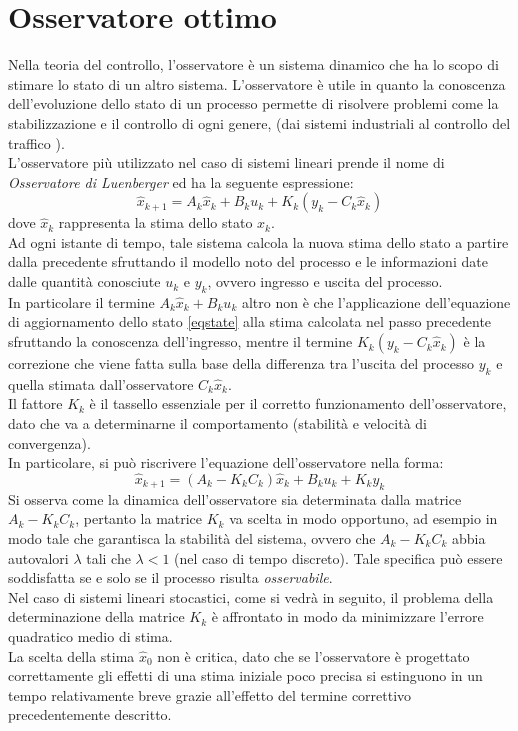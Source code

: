 \section{Osservatore ottimo}
Nella teoria del controllo, l'osservatore è un sistema dinamico che ha lo scopo di stimare lo stato di un altro sistema. L'osservatore è utile in quanto la conoscenza dell'evoluzione dello stato di un processo permette di risolvere problemi come la stabilizzazione e il controllo di ogni genere, (dai sistemi industriali \cite{Industrial} al controllo del traffico \cite{Traffic}).\\

L'osservatore più utilizzato nel caso di sistemi lineari prende il nome di \textit{Osservatore di Luenberger}\cite{bolzern} ed ha la seguente espressione:
\begin{equation}
\label{obsv}
\hat{x}_{k+1}=A_k\hat{x}_k+B_ku_k+K_k(y_k-C_k\hat{x}_k)
\end{equation}
dove $\hat{x}_k$ rappresenta la stima dello stato $x_k$.\\
Ad ogni istante di tempo, tale sistema calcola la nuova stima dello stato a partire dalla precedente sfruttando il modello noto del processo e le informazioni date dalle quantità conosciute $u_k$ e $y_k$, ovvero ingresso e uscita del processo. \\
In particolare il termine $A_k\hat{x}_k+B_ku_k$ altro non è che l'applicazione dell'equazione di aggiornamento dello stato \eqref{eqstate} alla stima calcolata nel passo precedente sfruttando la conoscenza dell'ingresso, mentre il termine $K_k(y_k-C_k\hat{x}_k)$ è la correzione che viene fatta sulla base della differenza tra l'uscita del processo $y_k$ e quella stimata dall'osservatore $C_k\hat{x}_k$.\\
Il fattore $K_k$ è il tassello essenziale per il corretto funzionamento dell'osservatore, dato che va a determinarne il comportamento (stabilità e velocità di convergenza).\\
In particolare, si può riscrivere l'equazione dell'osservatore nella forma:
\begin{equation}
\label{obsv2}
\hat{x}_{k+1}=(A_k-K_kC_k)\hat{x}_k+B_ku_k+K_ky_k
\end{equation}
Si osserva come la dinamica dell'osservatore sia determinata dalla matrice $A_k-K_kC_k$, pertanto la matrice $K_k$ va scelta in modo opportuno, ad esempio in modo tale che garantisca la stabilità del sistema, ovvero che $A_k-K_kC_k$ abbia autovalori $\lambda$ tali che $\lambda<1$ (nel caso di tempo discreto). Tale specifica può essere soddisfatta se e solo se il processo risulta \textit{osservabile}.\\
Nel caso di sistemi lineari stocastici, come si vedrà in seguito, il problema della determinazione della matrice $K_k$ è affrontato in modo da minimizzare l'errore quadratico medio di stima.\\
La scelta della stima $\hat{x}_0$ non è critica, dato che se l'osservatore è progettato correttamente gli effetti di una stima iniziale poco precisa si estinguono in un tempo relativamente breve grazie all'effetto del termine correttivo precedentemente descritto.

